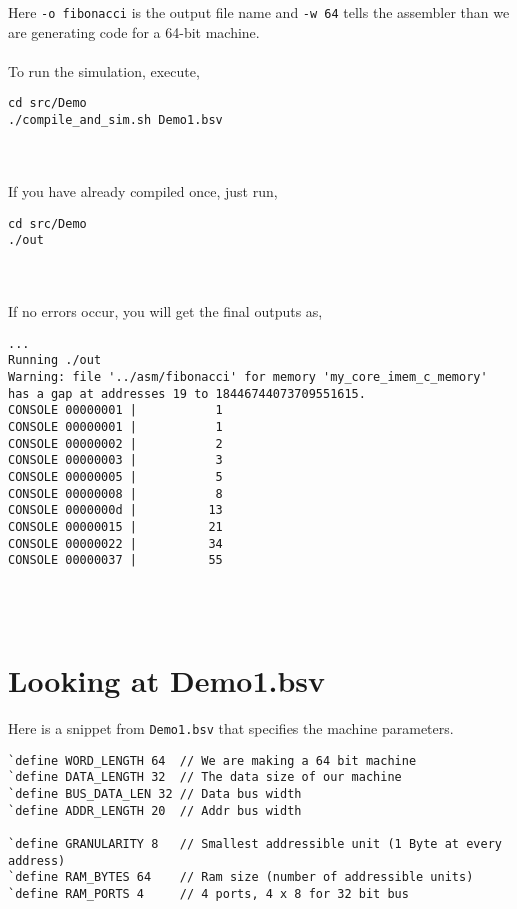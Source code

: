 \begin{paper}
\nointend Here \texttt{-o fibonacci} is the output file name and \texttt{-w 64} tells the assembler than we are generating code for a 64-bit machine.\\\\
\nointend To run the simulation, execute,
\begin{verbatim}
cd src/Demo
./compile_and_sim.sh Demo1.bsv
\end{verbatim}\\\\
\nointend If you have already compiled once, just run,
\begin{verbatim}
cd src/Demo
./out
\end{verbatim}\\\\
\nointend If no errors occur, you will get the final outputs as,
\begin{verbatim}
...
Running ./out
Warning: file '../asm/fibonacci' for memory 'my_core_imem_c_memory' has a gap at addresses 19 to 18446744073709551615.
CONSOLE 00000001 |           1
CONSOLE 00000001 |           1
CONSOLE 00000002 |           2
CONSOLE 00000003 |           3
CONSOLE 00000005 |           5
CONSOLE 00000008 |           8
CONSOLE 0000000d |          13
CONSOLE 00000015 |          21
CONSOLE 00000022 |          34
CONSOLE 00000037 |          55

\end{verbatim}\\\\
\section*{Looking at Demo1.bsv\sdot}
Here is a snippet from \texttt{Demo1.bsv} that specifies the machine parameters.
\begin{verbatim}
`define WORD_LENGTH 64  // We are making a 64 bit machine
`define DATA_LENGTH 32  // The data size of our machine
`define BUS_DATA_LEN 32 // Data bus width
`define ADDR_LENGTH 20  // Addr bus width

`define GRANULARITY 8   // Smallest addressible unit (1 Byte at every address)
`define RAM_BYTES 64    // Ram size (number of addressible units)
`define RAM_PORTS 4     // 4 ports, 4 x 8 for 32 bit bus


\end{verbatim}
\end{paper}
